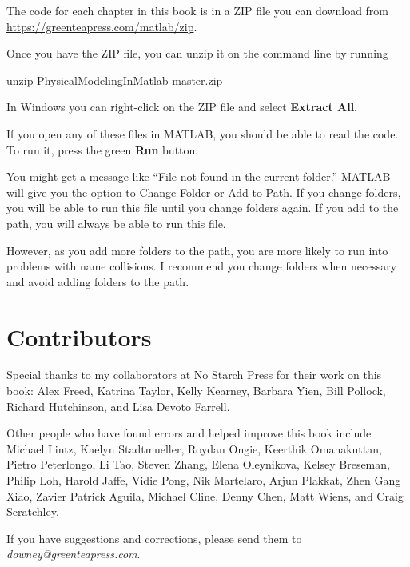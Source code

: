 
The code for each chapter in this book is in a ZIP file you can download from \url{https://greenteapress.com/matlab/zip}.

Once you have the ZIP file, you can unzip it on the command line by running

\begin{code}
unzip PhysicalModelingInMatlab-master.zip
\end{code}

In Windows you can right-click on the ZIP file and select \textbf{Extract All}.

If you open any of these files in MATLAB, you should be able to read the code.  To run it, press the green \textbf{Run} button.

You might get a message like ``File not found in the current folder.''
MATLAB will give you the option to Change Folder or Add to Path.  If you change folders, you will be able to run this file until you change folders again.  If you add to the path, you will always be able to run this file.

However, as you add more folders to the path, you are more likely to run into problems with name collisions.
I recommend you change folders when necessary and avoid adding folders to the path.


\section*{Contributors}

Special thanks to my collaborators at No Starch Press for their work on this book: Alex Freed, Katrina Taylor, Kelly Kearney, Barbara Yien, Bill Pollock, Richard Hutchinson, and Lisa Devoto Farrell.

Other people who have found errors and helped improve this book include
Michael Lintz,
Kaelyn Stadtmueller,
Roydan Ongie,
Keerthik Omanakuttan,
Pietro Peterlongo,
Li Tao,
Steven Zhang,
Elena Oleynikova,
Kelsey Breseman,
Philip Loh,
Harold Jaffe,
Vidie Pong,
Nik Martelaro,
Arjun Plakkat,
Zhen Gang Xiao,
Zavier Patrick Aguila,
Michael Cline,
Denny Chen,
Matt Wiens,
and Craig Scratchley.

If you have suggestions and corrections, please send them to \emph{downey@greenteapress.com}.
